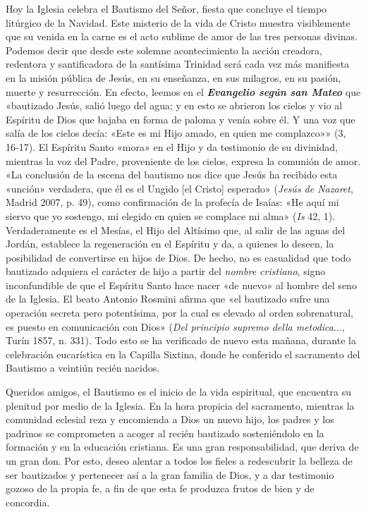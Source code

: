 \documentclass[]{article}
\begin{document}
Hoy la Iglesia celebra el Bautismo del Señor, fiesta que concluye el
tiempo litúrgico de la Navidad. Este misterio de la vida de Cristo
muestra visiblemente que su venida en la carne es el acto sublime de
amor de las tres personas divinas. Podemos decir que desde este solemne
acontecimiento la acción creadora, redentora y santificadora de la
santísima Trinidad será cada vez más manifiesta en la misión pública de
Jesús, en su enseñanza, en sus milagros, en su pasión, muerte y
resurrección. En efecto, leemos en el \emph{\textbf{Evangelio según san
Mateo}} que «bautizado Jesús, salió luego del agua; y en esto se
abrieron los cielos y vio al Espíritu de Dios que bajaba en forma de
paloma y venía sobre él. Y una voz que salía de los cielos decía: «Este
es mi Hijo amado, en quien me complazco»» (3, 16-17). El Espíritu Santo
«mora» en el Hijo y da testimonio de su divinidad, mientras la voz del
Padre, proveniente de los cielos, expresa la comunión de amor. «La
conclusión de la escena del bautismo nos dice que Jesús ha recibido esta
«unción» verdadera, que él es el Ungido {[}el Cristo{]} esperado»
(\emph{Jesús de Nazaret}, Madrid 2007, p. 49), como confirmación de la
profecía de Isaías: «He aquí mi siervo que yo sostengo, mi elegido en
quien se complace mi alma» (\emph{Is} 42, 1). Verdaderamente es el
Mesías, el Hijo del Altísimo que, al salir de las aguas del Jordán,
establece la regeneración en el Espíritu y da, a quienes lo deseen, la
posibilidad de convertirse en hijos de Dios. De hecho, no es casualidad
que todo bautizado adquiera el carácter de hijo a partir del
\emph{nombre cristiano}, signo inconfundible de que el Espíritu Santo
hace nacer «de nuevo» al hombre del seno de la Iglesia. El beato Antonio
Rosmini afirma que «el bautizado sufre una operación secreta pero
potentísima, por la cual es elevado al orden sobrenatural, es puesto en
comunicación con Dios» (\emph{Del principio supremo della metodica}...,
Turín 1857, n. 331). Todo esto se ha verificado de nuevo esta mañana,
durante la celebración eucarística en la Capilla Sixtina, donde he
conferido el sacramento del Bautismo a veintiún recién nacidos.

Queridos amigos, el Bautismo es el inicio de la vida espiritual, que
encuentra su plenitud por medio de la Iglesia. En la hora propicia del
sacramento, mientras la comunidad eclesial reza y encomienda a Dios un
nuevo hijo, los padres y los padrinos se comprometen a acoger al recién
bautizado sosteniéndolo en la formación y en la educación cristiana. Es
una gran responsabilidad, que deriva de un gran don. Por esto, deseo
alentar a todos los fieles a redescubrir la belleza de ser bautizados y
pertenecer así a la gran familia de Dios, y a dar testimonio gozoso de
la propia fe, a fin de que esta fe produzca frutos de bien y de
concordia.
\end{document}

